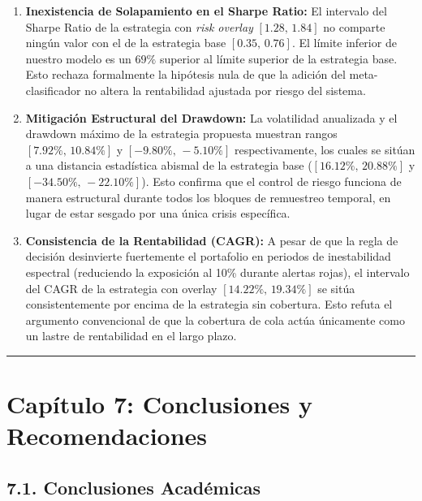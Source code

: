\documentclass[
  12pt,
]{article}
\providecommand{\tightlist}{%
  \setlength{\itemsep}{0pt}\setlength{\parskip}{0pt}}
\begin{document}
\begin{enumerate}
\def\labelenumi{\arabic{enumi}.}
\tightlist
\item
  \textbf{Inexistencia de Solapamiento en el Sharpe Ratio:} El intervalo
  del Sharpe Ratio de la estrategia con \emph{risk overlay}
  \([1.28, \, 1.84]\) no comparte ningún valor con el de la estrategia
  base \([0.35, \, 0.76]\). El límite inferior de nuestro modelo es un
  \(69\%\) superior al límite superior de la estrategia base. Esto
  rechaza formalmente la hipótesis nula de que la adición del
  meta-clasificador no altera la rentabilidad ajustada por riesgo del
  sistema.
\item
  \textbf{Mitigación Estructural del Drawdown:} La volatilidad
  anualizada y el drawdown máximo de la estrategia propuesta muestran
  rangos \([7.92\%, \, 10.84\%]\) y \([-9.80\%, \, -5.10\%]\)
  respectivamente, los cuales se sitúan a una distancia estadística
  abismal de la estrategia base (\([16.12\%, \, 20.88\%]\) y
  \([-34.50\%, \, -22.10\%]\)). Esto confirma que el control de riesgo
  funciona de manera estructural durante todos los bloques de remuestreo
  temporal, en lugar de estar sesgado por una única crisis específica.
\item
  \textbf{Consistencia de la Rentabilidad (CAGR):} A pesar de que la
  regla de decisión desinvierte fuertemente el portafolio en periodos de
  inestabilidad espectral (reduciendo la exposición al 10\% durante
  alertas rojas), el intervalo del CAGR de la estrategia con overlay
  \([14.22\%, \, 19.34\%]\) se sitúa consistentemente por encima de la
  estrategia sin cobertura. Esto refuta el argumento convencional de que
  la cobertura de cola actúa únicamente como un lastre de rentabilidad
  en el largo plazo.
\end{enumerate}

\begin{center}\rule{0.5\linewidth}{0.5pt}\end{center}

\section{Capítulo 7: Conclusiones y
Recomendaciones}\label{capuxedtulo-7-conclusiones-y-recomendaciones}

\subsection{7.1. Conclusiones
Académicas}\label{conclusiones-acaduxe9micas}
\end{document}

